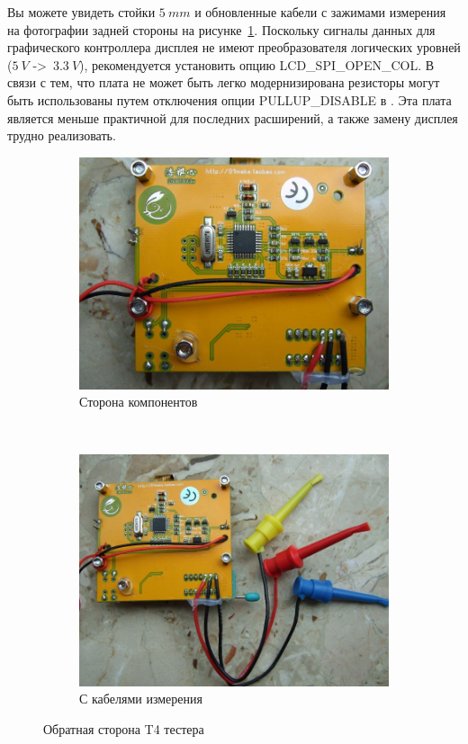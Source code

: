 Вы можете увидеть стойки \(5~mm\) и обновленные кабели с зажимами измерения на 
фотографии задней стороны на рисунке~\ref{fig:T4_back}.
Поскольку сигналы данных для графического контроллера дисплея не имеют преобразователя
логических уровней (\(5~V\) -\textgreater \ \(3.3~V\)), рекомендуется установить опцию LCD\_SPI\_OPEN\_COL.
В связи с тем, что плата не может быть легко модернизирована  резисторы могут быть
использованы путем отключения опции PULLUP\_DISABLE в .
Эта плата является меньше практичной для последних расширений, а также замену дисплея 
трудно реализовать.
\begin{figure}[H]
  \begin{subfigure}[b]{.5\textwidth}
    \centering
    \includegraphics[width=1.\textwidth]{../PNG/T4_back.JPG}
    \caption{Сторона компонентов}
  \end{subfigure}
  ~
  \begin{subfigure}[b]{.5\textwidth}
    \centering
    \includegraphics[width=1.\textwidth]{../PNG/T4_back_clips.JPG}
    \caption{С кабелями измерения}
  \end{subfigure}
  \caption{Обратная сторона T4 тестера}
  \label{fig:T4_back}
\end{figure}
